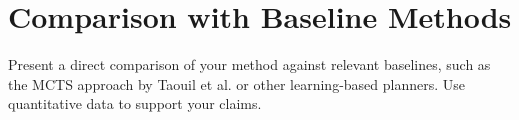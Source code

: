 \section{Comparison with Baseline Methods}

\begin{outline}
  Present a direct comparison of your method against relevant baselines, such as the MCTS approach by Taouil et al. or other learning-based planners. Use quantitative data to support your claims.
\end{outline}
